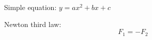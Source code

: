 \documentclass[11pt]{article}
\begin{document}
Simple equation: $y = ax^2 + bx + c$


Newton third law: $$F_1 = -F_2$$
\end{document}
